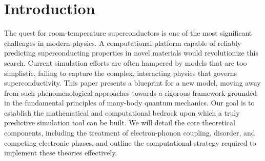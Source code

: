 \section{Introduction}
The quest for room-temperature superconductors is one of the most significant challenges in modern physics. A computational platform capable of reliably predicting superconducting properties in novel materials would revolutionize this search. Current simulation efforts are often hampered by models that are too simplistic, failing to capture the complex, interacting physics that governs superconductivity. This paper presents a blueprint for a new model, moving away from such phenomenological approaches towards a rigorous framework grounded in the fundamental principles of many-body quantum mechanics. Our goal is to establish the mathematical and computational bedrock upon which a truly predictive simulation tool can be built. We will detail the core theoretical components, including the treatment of electron-phonon coupling, disorder, and competing electronic phases, and outline the computational strategy required to implement these theories effectively.
